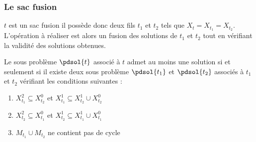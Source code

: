 \subsubsection{Le sac fusion}

$t$ est un sac fusion il possède donc deux fils $t_1$ et $t_2$ tels que $X_t = X_{t_1} = X_{t_2}$.
L'opération à réaliser est alors un fusion des solutions de $t_1$ et $t_2$ tout en vérifiant la
validité des solutions obtenues.

\begin{nlemma}
    Le sous problème $\pdsol{t}$ associé à $t$ admet au moins une solution si et seulement si il
    existe deux sous problème $\pdsol{t_1}$ et $\pdsol{t_2}$ associés à $t_1$ et $t_2$ vérifiant les
    conditions suivantes :
    \begin{enumerate}
        \item $X_{t_1}^2 \subseteq X_{t_2}^0$ et $X_{t_1}^1 \subseteq X_{t_2}^1 \cup X_{t_2}^0$
        \item $X_{t_2}^2 \subseteq X_{t_1}^0$ et $X_{t_2}^1 \subseteq X_{t_1}^1 \cup X_{t_1}^0$
        \item $M_{t_1} \cup M_{t_2}$ ne contient pas de cycle
    \end{enumerate}
\end{nlemma}

